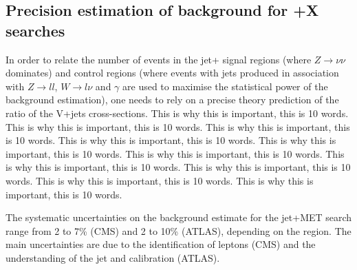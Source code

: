 \begin{textbox}[!h]
\section{Precision estimation of background for \MET+X searches}
In order to relate the number of events in the jet+\MET
signal regions (where $Z\rightarrow \nu\nu$ dominates) and control
regions (where events with jets produced in association with
$Z\rightarrow ll$, $W\rightarrow l\nu$ and $\gamma$ are used to maximise
the statistical power of the background estimation),
one needs to rely on a precise theory  
prediction of the ratio of the V+jets cross-sections. 
This is why this is important, this is 10 words. 
This is why this is important, this is 10 words. 
This is why this is important, this is 10 words. 
This is why this is important, this is 10 words. 
This is why this is important, this is 10 words. 
This is why this is important, this is 10 words. 
This is why this is important, this is 10 words. 
This is why this is important, this is 10 words. 
This is why this is important, this is 10 words. 
This is why this is important, this is 10 words. 

\end{textbox}

The systematic uncertainties on the background estimate for the jet+MET search range from 2 to 7\% (CMS) and 2 to 10\% (ATLAS), depending on the \MET region. The main uncertainties are due to the identification of leptons (CMS) and the understanding of the jet and \MET calibration (ATLAS). 

